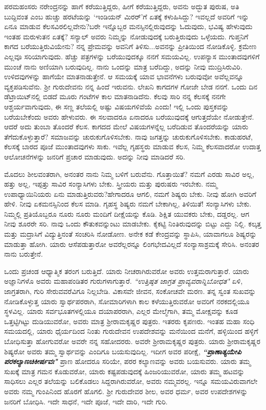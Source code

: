 ಪರಮಹಂಸರು ನರೇಂದ್ರನನ್ನು ಹಾಗೆ ಕರೆಯುತ್ತಿದ್ದರು, ಹೀಗೆ ಕರೆಯುತ್ತಿದ್ದರು, ಅವನು ಅದ್ಭುತ ಪುರುಷ, ಅತಿ ಬುದ್ದಿವಂತ \enginline{-} ಎಂಬ ಹುಚ್ಚು ಹರಟೆಯನ್ನು `ಇಂಡಿಯನ್ ಮಿರರ್'ಗೆ ಏತಕ್ಕೆ ಕಳುಹಿಸಿದ್ದು? ಇವಲ್ಲದೆ ಅವರಿಗೆ ಇನ್ನು ಏನೂ ಮಾಡುವ ಕೆಲಸವಿರಲಿಲ್ಲವೇನು?ಬರೇ ಇನ್ನೊಬ್ಬರ ಮನಸ್ಸಿನಲ್ಲಿರುವುದನ್ನು ಓದುವುದು, ಭವಿಷ್ಯ ಹೇಳುವುದು ಇಂತಹ ಮರುಳುತನ ಏತಕ್ಕೆ? ಸನ್ಯಾಲ್ ಅವರು ನಿಮ್ಮನ್ನು ನೋಡುವುದಕ್ಕೆ ಬರುತ್ತಿರುವುದು ಒಳ್ಳೆಯದು. ಗುಪ್ತನಿಗೆ ಕಾಗದ ಬರೆಯುತ್ತಿರುವಿಯೇನು? ನನ್ನ ಪ್ರೇಮವನ್ನು ಅವನಿಗೆ ತಿಳಿಸು...ಅವನನ್ನು ಪ್ರೀತಿಯಿಂದ ನೋಡಿಕೊಳ್ಳಿ. ಕ್ರಮೇಣ ಎಲ್ಲವೂ ಸರಿಯಾಗುವುದು. ಹೆಚ್ಚು ಪತ್ರಗಳನ್ನು ಬರೆಯುವುದಕ್ಕೂ ನನಗೆ ಸಮಯವಿಲ್ಲ. ಉಪನ್ಯಾಸ ಮುಂತಾದವುಗಳಿಗೆ ಮುಂಚೆ ನಾನು ಅಣಿಯಾಗಿ ಬರುವುದಿಲ್ಲ. ನಾನು ಒಂದನ್ನು ಮಾತ್ರ ಬರೆದಿದ್ದು, ಅದನ್ನು ನೀವು ಮುದ್ರಿಸಿರುವಿರಿ. ಉಳಿದವುಗಳನ್ನು ಹಾಗೆಯೇ ಮಾತನಾಡುತ್ತೇನೆ. ಆ ಸಮಯಕ್ಕೆ ಯಾವ ಭಾವನೆಗಳು ಬರುವುವೋ ಅವೆಲ್ಲವನ್ನೂ ವ್ಯಕ್ತಪಡಿಸುವೆನು. ಶ‍್ರೀ ಗುರುದೇವನು ನನ್ನ ಹಿಂದೆ ಇರುವನು. ಲೇಖನಿ ಕಾಗದಗಳ ಗೋಜೇ ಬೇಡ ನನಗೆ. ಒಂದು ದಿನ ಡೆಟ್ರಾಯಿಟ್‌ನಲ್ಲಿ ಬಿಡದೆ ಮೂರು ಗಂಟೆಗಳ ಕಾಲ ಮಾತನಾಡಿದೆನು. ಕೆಲವು ಸಾರಿ ನನ್ನ ಕೆಲಸಕ್ಕೆ ನನಗೇ ಆಶ್ಚರ್ಯವಾಗುವುದು, ಈ ಸಣ್ಣ ತಲೆಯಲ್ಲಿ ಅಷ್ಟು ವಿಷಯಗಳಿವೆಯೆ ಎಂದು! ಇಲ್ಲಿ ಒಂದು ಪುಸ್ತಕವನ್ನು ಬರೆಯಬೇಕೆಂದು ಅವರು ಹೇಳುವರು. ಈ ಸಲವಾದರೂ ಏನಾದರೂ ಬರೆಯುವುದಕ್ಕೆ ಆಗುತ್ತದೆಯೇ ನೋಡುತ್ತೇನೆ. ಆದರೆ ಅದು ತುಂಬಾ ತೊಂದರೆ ಕೆಲಸ. ಕಾಗದದ ಮೇಲೆ ವಿಷಯಗಳನ್ನೆಲ್ಲ ಬರೆದಿಡುವ ತೊಂದರೆಯನ್ನು ಯಾರು ತೆಗೆದುಕೊಳ್ಳುತ್ತಾರೆ? ಸಮಾಜವನ್ನು ಚುರುಕುಗೊಳಿಸಬೇಕು. ನಾವು ಜಗತ್ತನ್ನು ಚುರುಕುಗೊಳಿಸಬೇಕು. ಕಾಡುಹರಟೆ, ಕೆಲಸಕ್ಕೆ ಬಾರದ ಪೂಜೆ ಮುಂತಾದವುಗಳು ಸಾಕು. ಇವೆಲ್ಲ ಗೃಹಸ್ಥರು ಮಾಡುವ ಕೆಲಸ, ನಿಮ್ಮ ಕೆಲಸವಾದರೋ ಉದಾತ್ತ ಆಲೋಚನೆಗಳನ್ನು ಜನರಿಗೆ ಪ್ರಚಾರ ಮಾಡುವುದು. ಅದನ್ನು ನೀವು ಮಾಡಿದರೆ ಸರಿ.

ಮೊದಲು ಶೀಲವಂತರಾಗಿ, ಅನಂತರ ನಾನು ನಿಮ್ಮ ಬಳಿಗೆ ಬರುವೆನು. ಗೊತ್ತಾಯಿತೆ? ನಮಗೆ ಎರಡು ಸಾವಿರ ಅಲ್ಲ, ಹತ್ತು ಅಲ್ಲ, ಇಪ್ಪತ್ತು ಸಾವಿರ ಸಂನ್ಯಾಸಿಗಳು ಬೇಕು. ಸ್ತ್ರೀಯರು ಮತ್ತು ಪುರುಷರು ಇರಬೇಕು. ನಮ್ಮ ಉಪಾಧ್ಯಾಯಿನಿಯರು ಏನು ಮಾಡುತ್ತಿರುವರು?ಹೇಗಾದರೂ ಆಗಲಿ, ನಮಗೆ ಶಿಷ್ಯರು ಬೇಕು. ನೀವು ಹೋಗಿ ಅವರಿಗೆ ಹೇಳಿ. ನೀವು ಏಕಮನಸ್ಸಿನಿಂದ ಕೆಲಸ ಮಾಡಿ. ಗೃಹಸ್ಥ ಶಿಷ್ಯರು ನಮಗೆ ಬೇಕಾಗಿಲ್ಲ, ತಿಳಿಯಿತೆ! ಸಂನ್ಯಾಸಿಗಳು ಬೇಕು. ನಿಮ್ಮಲ್ಲಿ ಪ್ರತಿಯೊಬ್ಬರೂ ನೂರು ನೂರು ಮಂದಿಗೆ ದೀಕ್ಷೆಯನ್ನು ಕೊಡಿ. ಶಿಕ್ಷಿತ ಯುವಕರು ಬೇಕು, ದಡ್ಡರಲ್ಲ. ಆಗ ನೀವು ಶೂರರೇ ಸರಿ. ನಾವು ಒಂದು ಕೌತುಕವನ್ನುಂಟು ಮಾಡಬೇಕು. ಕೈಕಟ್ಟಿ ನಿಂತಿರುವುದನ್ನು ಬಿಟ್ಟು ಎದ್ದು ನಿಲ್ಲಿ. ಕಲ್ಕತ್ತ ಮತ್ತು ಮದ್ರಾಸಿಗೆ ವಿದ್ಯುತ್ತಿನಂತೆ ಸಂಚರಿಸಿ ನೋಡೋಣ. ಅನೇಕ ಕಡೆ ಕೇಂದ್ರವನ್ನು ಸ್ಥಾಪಿಸಿ, ಯಾವಾಗಲೂ ಶಿಷ್ಯರನ್ನು ಮಾಡುತ್ತಾ ಹೋಗಿ. ಯಾರು ಆಸೆಪಡುತ್ತಾರೋ ಅವರೆಲ್ಲರನ್ನೂ ಲಿಂಗಭೇದವಿಲ್ಲದೆ ಸಂನ್ಯಾಸಾಶ್ರಮಕ್ಕೆ ಸೇರಿಸಿ. ಅನಂತರ ನಾನು ಬರುತ್ತೇನೆ.

ಒಂದು ಪ್ರಚಂಡ ಆಧ್ಯಾತ್ಮಿಕ ತರಂಗ ಬರುತ್ತಿದೆ. ಯಾರು ನೀಚರಾಗಿರುವರೋ ಅವರು ಉತ್ತಮರಾಗುತ್ತಾರೆ. ಯಾರು ಅಜ್ಞಾನಿಗಳೊ ಅವರು ಮಹಾಪಂಡಿತರ ಗುರುಗಳಾಗುತ್ತಾರೆ. \textit{``ಉತ್ತಿಷ್ಠತ ಜಾಗ್ರತ ಪ್ರಾವ್ಯವರಾನ್ನಿಬೋಧತ"} ಏಳಿ, ಜಾಗ್ರತರಾಗಿ, ಗುರಿ ಸೇರುವವರೆವಿಗೂ ನಿಲ್ಲಬೇಡಿ. ವಿಕಾಸವೇ ಜೀವನ, ಸಂಕೋಚವೇ ಮರಣ. ತನ್ನ ಸ್ವಂತ ಸುಖವನ್ನು ನೋಡಿಕೊಳ್ಳುತ್ತ ಯಾರು ಸ್ವಾರ್ಥಪರರಾಗಿ, ಸೋಮಾರಿಗಳಾಗಿ ಕಾಲ ಕಳೆಯುತ್ತಿರುವರೋ ಅವರಿಗೆ ನರಕದಲ್ಲಿಯೂ ಸ್ಥಳವಿಲ್ಲ. ಯಾರು ಸರ್ವಭೂತಗಳಲ್ಲಿಯೂ ದಯಾಪರರಾಗಿ, ಎಲ್ಲರ ಮೇಲ್ಮೆಗಾಗಿ, ತಮ್ಮ ಮೋಕ್ಷವನ್ನು ಕೂಡ ಒತ್ತಟ್ಟಿಗಿಟ್ಟು ದುಡಿಯುವರೋ, ಅವರು ಮಾತ್ರ ಶ‍್ರೀರಾಮಕೃಷ್ಣರ ಪುತ್ರರು. ಇತರರು ಕೃಪಣರು. ಇಂತಹ ಮಹಾ ಸಂಧಿ ಸಮಯದಲ್ಲಿ, ಯಾರು ಧೈರ್ಯದಿಂದ ನಿಂತು ಗುರುದೇವನ ಉಪದೇಶವನ್ನು ಮನೆಯಿಂದ ಮನೆಗೆ, ಹಳ್ಳಿಯಿಂದ ಹಳ್ಳಿಗೆ ಬೋಧಿಸುತ್ತಾ ಹೋಗುವರೋ ಅವರೇ ನನ್ನ ಸಹೋದರರು. ಅವರೇ ಶ‍್ರೀರಾಮಕೃಷ್ಣರ ಪುತ್ರರು. ಯಾರು ಶ‍್ರೀರಾಮಕೃಷ್ಣರ ಶಿಷ್ಯರೋ ಅವರು ತಮ್ಮ ಸ್ವಾರ್ಥವನ್ನು ಎಂದಿಗೂ ಬಯಸುವುದಿಲ್ಲ. ಇದೀಗ ಅವರ ಪರೀಕ್ಷೆ, \textbf{\textit{``ಪ್ರಾಣಾತ್ಯಯೇಪಿ ಪರಕಲ್ಯಾಣಚಿಕೀರ್ಷವಃ"}} ಪ್ರಾಣ ಹೋದರೂ ಸರಿಯೇ, ಪರರ ಕಲ್ಯಾಣವನ್ನು ಅವರು ಬಯಸುವರು. ಯಾರು ತಮ್ಮ ಸುಖಕ್ಕೆ ಮಾತ್ರ ಗಮನ ಕೊಡುವರೋ, ಯಾರು ಕಷ್ಟಪಡುವುದಕ್ಕೆ ಹಿಂಜರಿಯುವರೋ, ಯಾರು ತಮ್ಮ ಹಟವನ್ನು ಸಾಧಿಸಲು ಎಲ್ಲರ ತಲೆಯನ್ನು ಬಲಿಕೊಡಲು ಸಿದ್ದರಾಗಿರುವರೋ, ಅವರು ನಮ್ಮವರಲ್ಲ. ಇನ್ನೂ ಸಮಯವಿರುವಾಗಲೇ ಅವರು ನಮ್ಮ ಗುಂಪಿನಿಂದ ಹೊರಗೆ ಹೊಗಲಿ. ಶ‍್ರೀ ಗುರುದೇವರ ಶೀಲ, ಅವರ ಧರ್ಮ, ಅವರ ಉಪದೇಶಗಳನ್ನು ಜನರಿಗೆ ಬೋಧಿಸಿ. ಇದೇ ಸಾಧನೆ, ಇದೇ ಪೂಜೆ, ಇದೇ ದಾರಿ, ಇದೇ ಗುರಿ.

